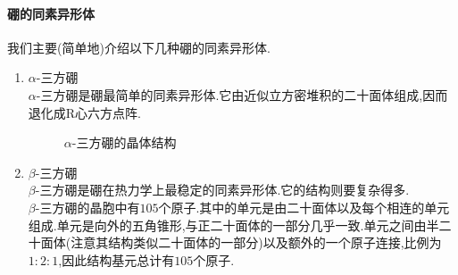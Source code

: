 \documentclass{ctexart}
\begin{document}
\paragraph{硼的同素异形体}
我们主要(简单地)介绍以下几种硼的同素异形体.
\begin{enumerate}[label=\tbf{\arabic*.},topsep=0pt,parsep=0pt,itemsep=0pt,partopsep=0pt]
    \item $\alpha$-三方硼\\
        $\alpha$-三方硼是硼最简单的同素异形体.它由近似立方密堆积的二十面体组成,因而退化成R心六方点阵.
        \begin{figure}[H]
            \centering
            \caption{$\alpha$-三方硼的晶体结构}
        \end{figure}
    \item $\beta$-三方硼\\
        $\beta$-三方硼是硼在热力学上最稳定的同素异形体.它的结构则要复杂得多.\\
        $\beta$-三方硼的晶胞中有$105$个原子.其中的单元是由二十面体以及每个相连的单元组成.单元是向外的五角锥形,与正二十面体的一部分几乎一致.单元之间由半二十面体(注意其结构类似二十面体的一部分)以及额外的一个原子连接,比例为$1:2:1$,因此结构基元总计有$105$个原子.
        \begin{figure}[H]
            \centering
\end{figure}
\end{enumerate}
\end{document}
